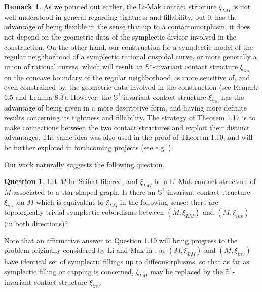 \documentclass[11pt]{amsart}
\theoremstyle{plain}
\numberwithin{theorem}{section}
\theoremstyle{definition}
\newtheorem{question}[theorem]{Question}
\newtheorem{remark}[theorem]{Remark}
\newcommand{\s}{{\mathbb S}}
\begin{document}
\begin{remark}
As we pointed out earlier, the Li-Mak contact structure $\xi_{LM}$ is not well understood in general regarding tightness and fillability, but it has the advantage of being flexible in the sense that up to a contactomorphism, it does not depend on the geometric data of the symplectic divisor involved in the construction. On the other hand, our construction for a symplectic model of the regular neighborhood of a symplectic rational cuspidal curve, or more generally a union of rational curves, which will result an $\s^1$-invariant contact structure $\xi_{inv}$ on the concave boundary of the regular neighborhood, is more sensitive of, and even constrained by, the geometric data involved in the construction (see Remark 6.5 and Lemma 8.3). However, the $\s^1$-invariant contact structure $\xi_{inv}$ has the advantage of being given in a more descriptive form, and having more definite results concerning its tightness and fillability. The strategy of Theorem 1.17 is to make connections between the two contact structures and exploit their distinct advantages. The same idea was also used in the proof of Theorem 1.10, and will be further explored in forthcoming projects (see e.g. \cite{C4}).
\end{remark}

Our work naturally suggests the following question.

\begin{question}
Let $M$ be Seifert fibered, and $\xi_{LM}$ be a Li-Mak contact structure of $M$ associated to
a star-shaped graph. Is there an $\s^1$-invariant contact structure $\xi_{inv}$ on $M$ which is equivalent to 
$\xi_{LM}$ in the following sense: there are topologically trivial symplectic cobordisms between 
$(M,\xi_{LM})$ and $(M,\xi_{inv})$ (in both directions)? 
\end{question}

Note that an affirmative answer to Question 1.19 will bring progress to the problem originally considered by Li and Mak in \cite{LM}, as $(M,\xi_{LM})$ and $(M,\xi_{inv})$ have identical set of symplectic fillings up to diffeomorphisms, so that as far as symplectic filling or capping is concerned, $\xi_{LM}$ may be replaced by
the $\s^1$-invariant contact structure $\xi_{inv}$.

\vspace{2mm}
\end{document}
